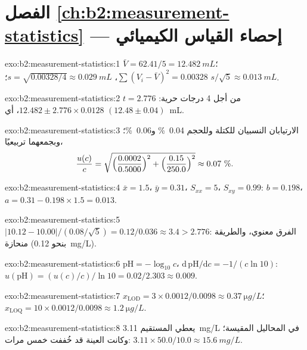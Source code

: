 \section*{الفصل \ref{ch:b2:measurement-statistics} --- إحصاء القياس الكيميائي}

\begin{solution}{exo:b2:measurement-statistics:1}
$\bar V = 62.41/5 = \qty{12.482}{mL}$؛ $\sum(V_i - \bar V)^2 = 0.00328$، $s = \sqrt{0.00328/4} \approx
\qty{0.029}{mL}$؛ $s/\sqrt5 \approx \qty{0.013}{mL}$.
\end{solution}

\begin{solution}{exo:b2:measurement-statistics:2}
$t = 2.776$ من أجل 4 درجات حرية: $12.482 \pm 2.776 \times 0.0128$، أي $(12.48 \pm 0.04)$~mL.
\end{solution}

\begin{solution}{exo:b2:measurement-statistics:3}
الارتيابان النسبيان للكتلة وللحجم 0.04~\% و0.06~\%؛ وبجمعهما
تربيعيًا،
\[\frac{u(c)}{c} = \sqrt{\Bigl(\frac{0.0002}{0.5000}\Bigr)^2 + \Bigl(\frac{0.15}{250.0}\Bigr)^2}
\approx 0.07~\%.\]
\end{solution}

\begin{solution}{exo:b2:measurement-statistics:4}
$\bar x = 1.5$، $\bar y = 0.31$، $S_{xx} = 5$، $S_{xy} = 0.99$: $b = 0.198$، $a = 0.31 - 0.198 \times 1.5
= 0.013$.
\end{solution}

\begin{solution}{exo:b2:measurement-statistics:5}
$|10.12 - 10.00|/(0.08/\sqrt5) = 0.12/0.036 \approx 3.4 > 2.776$: الفرق معنوي، 
والطريقة منحازة (بنحو \qty{+0.12}{mg/L}).
\end{solution}

\begin{solution}{exo:b2:measurement-statistics:6}
$\mathrm{pH} = -\log_{10}c$، $\mathrm d\,\mathrm{pH}/\mathrm dc = -1/(c\ln10)$:
$u(\mathrm{pH}) = (u(c)/c)/\ln10 = 0.02/2.303 \approx 0.009$.
\end{solution}

\begin{solution}{exo:b2:measurement-statistics:7}
$x_{\mathrm{LOD}} = 3 \times 0.0012/0.0098 \approx \qty{0.37}{\micro g/L}$؛ $x_{\mathrm{LOQ}} = 10
\times 0.0012/0.0098 \approx \qty{1.2}{\micro g/L}$.
\end{solution}

\begin{solution}{exo:b2:measurement-statistics:8}
يعطي المستقيم \qty{3.11}{mg/L} في المحاليل المقيسة؛ وكانت العينة قد خُففت خمس مرات:
$3.11 \times 50.0/10.0 \approx \qty{15.6}{mg/L}$.
\end{solution}

